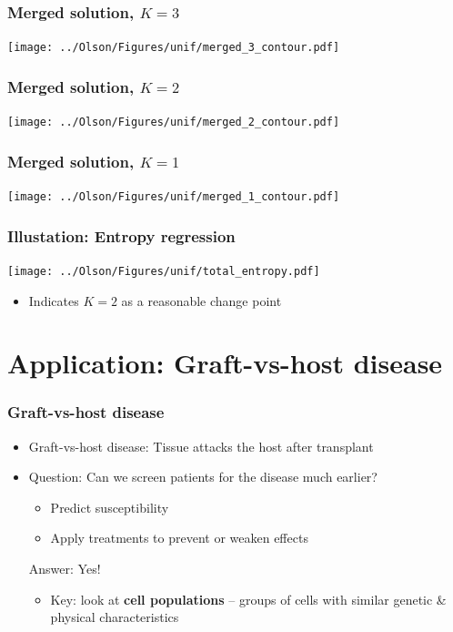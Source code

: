\documentclass[mathserif,compress]{beamer}
\renewcommand\;{\,}
\begin{document}
\begin{frame}\frametitle{Merged solution, $K = 3$}
\begin{center}
\texttt{[image: ../Olson/Figures/unif/merged\_3\_contour.pdf]}
\end{center}
\end{frame}

\begin{frame}\frametitle{Merged solution, $K = 2$}
\begin{center}
\texttt{[image: ../Olson/Figures/unif/merged\_2\_contour.pdf]}
\end{center}
\end{frame}

\begin{frame}\frametitle{Merged solution, $K = 1$}
\begin{center}
\texttt{[image: ../Olson/Figures/unif/merged\_1\_contour.pdf]}
\end{center}
\end{frame}


\begin{frame}\frametitle{Illustation: Entropy regression}
\begin{center}
\texttt{[image: ../Olson/Figures/unif/total\_entropy.pdf]}
\end{center}
\begin{itemize}
\item
Indicates $K = 2$ as a reasonable change point
\end{itemize}

\end{frame}

\section{Application: Graft-vs-host disease}
\begin{frame}\frametitle{Graft-vs-host disease}
\begin{itemize}
\item[]
\alert{Graft-vs-host disease:} Tissue attacks the host after transplant
\bigskip
\item[]
\alert{Question:} Can we screen patients for the disease much earlier?
\begin{itemize}
\item
Predict susceptibility
\bigskip
\item
Apply treatments to prevent or weaken effects
\end{itemize}
\bigskip
\alert{Answer}: Yes!
\bigskip
\begin{itemize}
\item
Key: look at \textbf{cell populations} -- groups of cells with similar genetic \& physical characteristics
\end{itemize}
\end{itemize}
\end{frame}
\end{document}
